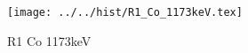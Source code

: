 \begin{figure}[h] \centering\texttt{[image: ../../hist/R1\_Co\_1173keV.tex]}\caption{R1 Co 1173keV}\label{hist:R1_Co_1173keV} \end{figure}
